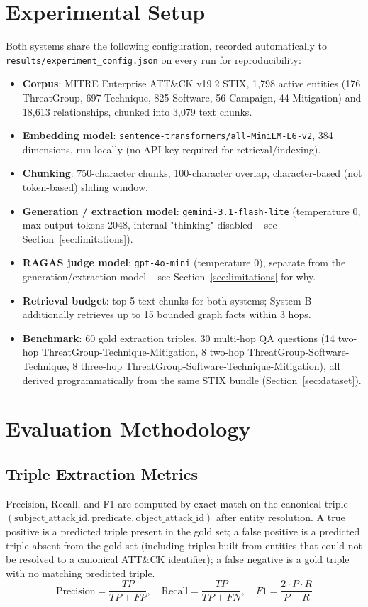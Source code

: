 \documentclass[conference]{IEEEtran}
\begin{document}
\section{Experimental Setup}
Both systems share the following configuration, recorded automatically to
\texttt{results/experiment\_config.json} on every run for reproducibility:

\begin{itemize}
\item \textbf{Corpus}: MITRE Enterprise ATT\&CK v19.2 STIX, 1{,}798 active
  entities (176 ThreatGroup, 697 Technique, 825 Software, 56 Campaign, 44
  Mitigation) and 18{,}613 relationships, chunked into 3{,}079 text chunks.
\item \textbf{Embedding model}: \texttt{sentence-transformers/all-MiniLM-L6-v2},
  384 dimensions, run locally (no API key required for retrieval/indexing).
\item \textbf{Chunking}: 750-character chunks, 100-character overlap,
  character-based (not token-based) sliding window.
\item \textbf{Generation / extraction model}: \texttt{gemini-3.1-flash-lite}
  (temperature 0, max output tokens 2048, internal "thinking" disabled --
  see Section~\ref{sec:limitations}).
\item \textbf{RAGAS judge model}: \texttt{gpt-4o-mini} (temperature 0),
  separate from the generation/extraction model -- see
  Section~\ref{sec:limitations} for why.
\item \textbf{Retrieval budget}: top-5 text chunks for both systems; System B
  additionally retrieves up to 15 bounded graph facts within 3 hops.
\item \textbf{Benchmark}: 60 gold extraction triples, 30 multi-hop QA
  questions (14 two-hop ThreatGroup-Technique-Mitigation, 8 two-hop
  ThreatGroup-Software-Technique, 8 three-hop
  ThreatGroup-Software-Technique-Mitigation), all derived programmatically
  from the same STIX bundle (Section~\ref{sec:dataset}).
\end{itemize}

\section{Evaluation Methodology}
\subsection{Triple Extraction Metrics}
Precision, Recall, and F1 are computed by exact match on the canonical
triple $(\text{subject\_attack\_id}, \text{predicate}, \text{object\_attack\_id})$
after entity resolution. A true positive is a predicted triple present in
the gold set; a false positive is a predicted triple absent from the gold
set (including triples built from entities that could not be resolved to a
canonical ATT\&CK identifier); a false negative is a gold triple with no
matching predicted triple.
$$\text{Precision} = \frac{TP}{TP+FP}, \quad \text{Recall} = \frac{TP}{TP+FN}, \quad F1 = \frac{2 \cdot P \cdot R}{P+R}$$
\end{document}
